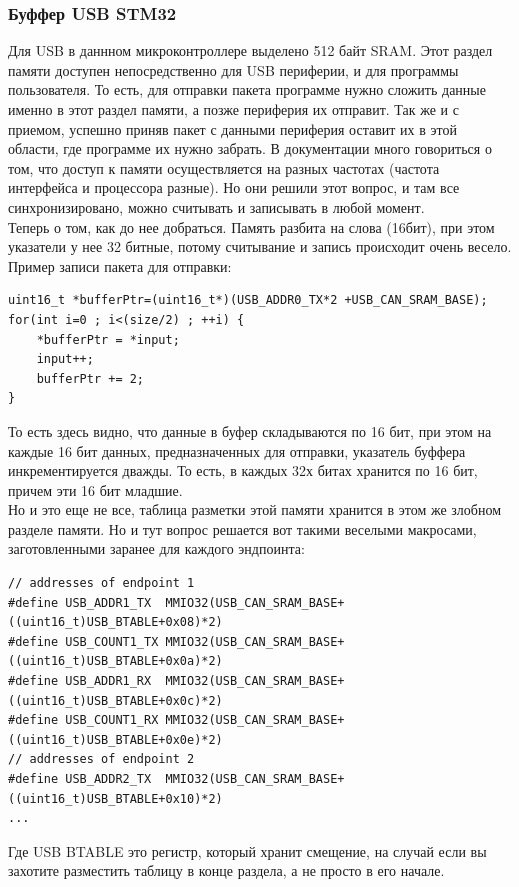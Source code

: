 \documentclass[12pt,a4paper]{article}
\begin{document}
\subsubsection{Буффер USB STM32}
    Для USB в даннном микроконтроллере выделено 512 байт SRAM. Этот раздел памяти
    доступен непосредственно для USB периферии, и для программы пользователя.
    То есть, для отправки пакета программе нужно сложить данные именно в этот
    раздел памяти, а позже периферия их отправит. Так же и с приемом, успешно
    приняв пакет с данными периферия оставит их в этой области, где программе
    их нужно забрать. В документации много говориться о том, что доступ к
    памяти осуществляется на разных частотах (частота интерфейса и процессора
    разные). Но они решили этот вопрос, и там все синхронизировано, можно
    считывать и записывать в любой момент.\\
    Теперь о том, как до нее добраться. Память разбита на слова (16бит), при
    этом указатели у нее 32 битные, потому считывание и запись происходит
    очень весело. Пример записи пакета для отправки:
\lstset{language=c}
\begin{lstlisting}
uint16_t *bufferPtr=(uint16_t*)(USB_ADDR0_TX*2 +USB_CAN_SRAM_BASE);
for(int i=0 ; i<(size/2) ; ++i) {
    *bufferPtr = *input;
    input++;
    bufferPtr += 2;
}
\end{lstlisting}
    То есть здесь видно, что данные в буфер складываются по 16 бит, при этом на
    каждые 16 бит данных, предназначенных для отправки, указатель буффера
    инкрементируется дважды. То есть, в каждых 32х битах хранится по 16 бит,
    причем эти 16 бит младшие.\\
    Но и это еще не все, таблица разметки этой памяти хранится в этом
    же злобном разделе памяти. Но и тут вопрос решается вот такими веселыми макросами,
    заготовленными заранее для каждого эндпоинта:
\begin{lstlisting}
// addresses of endpoint 1
#define USB_ADDR1_TX  MMIO32(USB_CAN_SRAM_BASE+((uint16_t)USB_BTABLE+0x08)*2)
#define USB_COUNT1_TX MMIO32(USB_CAN_SRAM_BASE+((uint16_t)USB_BTABLE+0x0a)*2)
#define USB_ADDR1_RX  MMIO32(USB_CAN_SRAM_BASE+((uint16_t)USB_BTABLE+0x0c)*2)
#define USB_COUNT1_RX MMIO32(USB_CAN_SRAM_BASE+((uint16_t)USB_BTABLE+0x0e)*2)
// addresses of endpoint 2
#define USB_ADDR2_TX  MMIO32(USB_CAN_SRAM_BASE+((uint16_t)USB_BTABLE+0x10)*2)
...
\end{lstlisting}
    Где USB BTABLE это регистр, который хранит смещение, на случай если вы
    захотите разместить таблицу в конце раздела, а не просто в его начале.
\end{document}
